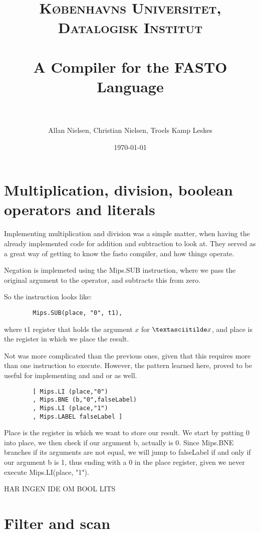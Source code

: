 \documentclass[paper=a4, fontsize=11pt]{scrartcl} %
\title{	
\normalfont \normalsize 
\textsc{Københavns Universitet, Datalogisk Institut} \\ [25pt] %
\horrule{0.5pt} \\[0.4cm] %
\huge A Compiler for the FASTO Language\\ %
\horrule{2pt} \\[0.5cm] %
}
\author{Allan Nielsen, Christian Nielsen, Troels Kamp Leskes} %
\date{\normalsize\today} %
\numberwithin{equation}{section} %
\numberwithin{figure}{section} %
\numberwithin{table}{section} %
\begin{document}
\maketitle %
\tableofcontents

\pagebreak


\section{Multiplication, division, boolean operators and literals}

	Implementing multiplication and division was a simple matter, when having the already implemented code for addition and subtraction to look at. They served as a great way of getting to know the fasto compiler, and how things operate.
	
	Negation is implemeted using the Mips.SUB instruction, where we pass the original argument to the operator, and subtracts this from zero.

	So the instruction looks like:
	\begin{verbatim}
		Mips.SUB(place, "0", t1),
	\end{verbatim}

	where t1 register that holds the argument $x$ for $\textasciitilde x$, and place is the register in which we place the result.

	Not was more complicated than the previous ones, given that this requires more than one instruction to execute. However, the pattern learned here, proved to be useful for implementing and and or as well.

	\begin{verbatim}
		[ Mips.LI (place,"0")
		, Mips.BNE (b,"0",falseLabel)
		, Mips.LI (place,"1")
		, Mips.LABEL falseLabel ]
    \end{verbatim}
    
    Place is the register in which we want to store our result. We start by putting 0 into place, we then check if our argument b, actually is 0. Since Mips.BNE branches if its arguments are not equal, we will jump to falseLabel if and only if our argument b is 1, thus ending with a 0 in the place register, given we never execute Mips.LI(place, "1").

	{\Large HAR INGEN IDE OM BOOL LITS}
 
\section{Filter and scan}
\end{document}
